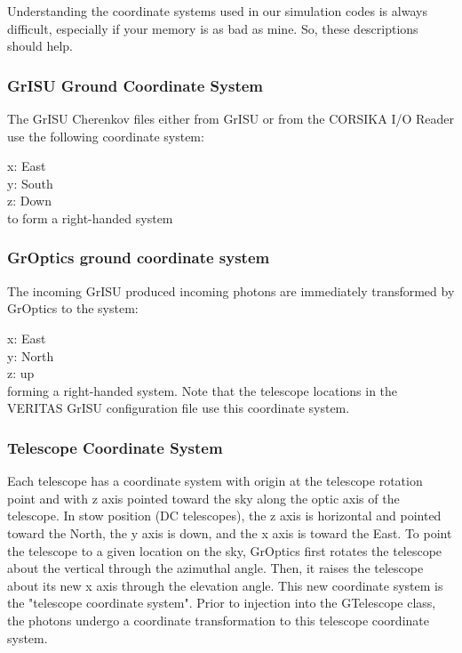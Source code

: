 \documentclass{article}
\begin{document}
Understanding the coordinate systems used in our simulation codes 
is always difficult, especially if your memory is as bad as mine.  
So, these descriptions should help.

\subsubsection{GrISU Ground Coordinate System}
  The GrISU Cherenkov files either from GrISU or from the 
CORSIKA I/O Reader use the following coordinate system:

\noindent
\hspace*{20pt}x:  East \\ 
\hspace*{20pt}y:  South \\
\hspace*{20pt}z:  Down \\
to form a right-handed system

\subsubsection{GrOptics ground coordinate system}

The incoming GrISU produced incoming photons are immediately transformed
by GrOptics to the system:

\noindent
\hspace*{20pt}x: East \\
\hspace*{20pt}y: North\\
\hspace*{20pt}z: up\\
forming a right-handed system. Note that the telescope locations in the
VERITAS GrISU configuration file use this coordinate system.
 
\subsubsection{Telescope Coordinate System}  
  Each telescope has a coordinate system with origin at the 
  telescope rotation 
  point and with z axis pointed toward the sky along the optic axis of the 
  telescope.  In stow position (DC telescopes), the z axis is horizontal and 
  pointed toward the North,  
  the y axis is down, and 
  the x axis is toward the East.  To point the telescope to a given location on the 
  sky, GrOptics first rotates the telescope about the vertical through the azimuthal angle. 
  Then, it raises the telescope about its new x axis through the elevation angle.  This
  new coordinate system is the "telescope coordinate system".  Prior to injection 
  into the GTelescope class, the photons undergo a coordinate transformation to this
  telescope coordinate system.
\end{document}
